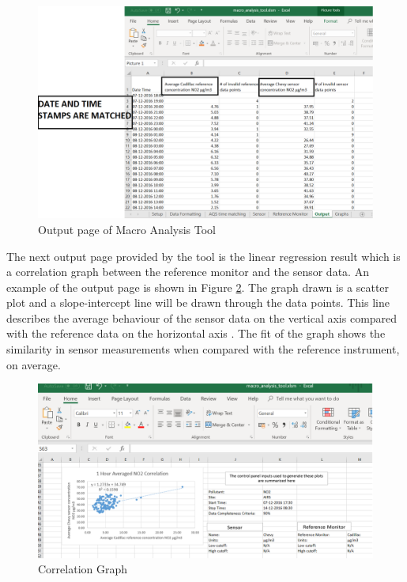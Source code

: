 \begin{figure}[h]
    \begin{center}
    \includegraphics[scale=0.55]{./images/figure6.png}
    \end{center}
    \caption{Output page of Macro Analysis Tool \cite{MATEXCEL}}
    \label{MAT}
    \hspace{1 cm}
  \end{figure}

\par


The next output page provided by the tool is the linear regression result which is a correlation graph between the reference monitor and the sensor data. An example of the output page is shown in Figure \ref{cor}. The graph drawn is a scatter plot and a slope-intercept line will be drawn through the data points. This line describes the average behaviour of the sensor data on the vertical axis compared with the reference data on the horizontal axis \cite{National2017}. The fit of the graph shows the similarity in sensor measurements when compared with the reference instrument, on average. 

\hspace{1 cm}
\begin{figure}[h]
    \begin{center}
    \includegraphics[scale=0.50]{./images/figure7.png}
    \end{center}
    \caption{Correlation Graph}
    \label{cor}
  \end{figure}
 
